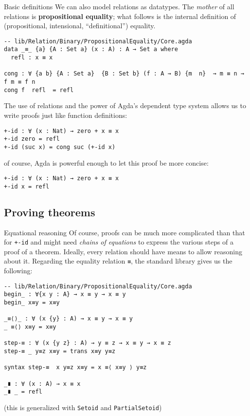 \documentclass[t,aspectratio=169,9pt]{beamer}
\begin{document}
\begin{frame}[fragile]{Basic definitions}
  We can also model relations as datatypes. The {\it mother} of all relations is
  {\bf propositional equality}; what follows is the internal definition of
  (propositional, intensional, ``definitional'') equality.
\begin{verbatim}
-- lib/Relation/Binary/PropositionalEquality/Core.agda
data _≡_ {a} {A : Set a} (x : A) : A → Set a where
  refl : x ≡ x

cong : ∀ {a b} {A : Set a}  {B : Set b} (f : A → B) {m  n}  → m ≡ n → f m ≡ f n
cong f  refl  = refl
\end{verbatim}
The use of relations and the power of Agda's dependent type system allows us to
write proofs just like function definitions: 
\begin{verbatim}
+-id : ∀ (x : Nat) → zero + x ≡ x
+-id zero = refl
+-id (suc x) = cong suc (+-id x)
\end{verbatim}
of course, Agda is powerful enough to let this proof be more concise:
\begin{verbatim}
+-id : ∀ (x : Nat) → zero + x ≡ x
+-id x = refl
\end{verbatim}
\end{frame}

\subsection[proofs]{Proving theorems}
\begin{frame}[fragile]{Equational reasoning}
  Of course, proofs can be much more complicated than that for
  \texttt{+-id} and might need {\it chains of equations} to express
  the various steps of a proof of a theorem. Ideally, every relation should have
  means to allow reasoning about it. Regarding the equality relation
  \texttt{≡}, the standard library gives us the following: 
\vfill
\begin{verbatim}
-- lib/Relation/Binary/PropositionalEquality/Core.agda
begin_ : ∀{x y : A} → x ≡ y → x ≡ y
begin_ x≡y = x≡y

_≡⟨⟩_ : ∀ (x {y} : A) → x ≡ y → x ≡ y
_ ≡⟨⟩ x≡y = x≡y

step-≡ : ∀ (x {y z} : A) → y ≡ z → x ≡ y → x ≡ z
step-≡ _ y≡z x≡y = trans x≡y y≡z

syntax step-≡  x y≡z x≡y = x ≡⟨ x≡y ⟩ y≡z

_∎ : ∀ (x : A) → x ≡ x
_∎ _ = refl
\end{verbatim}
\vfill
  (this is generalized with \texttt{Setoid} and
  \texttt{PartialSetoid})
\end{frame}
\end{document}
